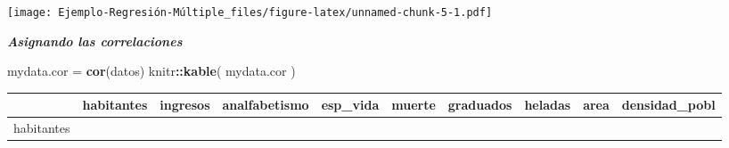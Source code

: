 \documentclass[]{article}
\newenvironment{Shaded}{\begin{snugshade}}{\end{snugshade}}
\newcommand{\KeywordTok}[1]{\textcolor[rgb]{0.13,0.29,0.53}{\textbf{#1}}}
\newcommand{\StringTok}[1]{\textcolor[rgb]{0.31,0.60,0.02}{#1}}
\newcommand{\OperatorTok}[1]{\textcolor[rgb]{0.81,0.36,0.00}{\textbf{#1}}}
\newcommand{\NormalTok}[1]{#1}
\begin{document}
\texttt{[image: Ejemplo-Regresión-Múltiple\_files/figure-latex/unnamed-chunk-5-1.pdf]}

\emph{\textbf{Asignando las correlaciones}}

\begin{Shaded}
\begin{Highlighting}[]
\NormalTok{mydata.cor =}\StringTok{ }\KeywordTok{cor}\NormalTok{(datos)}
\NormalTok{knitr}\OperatorTok{::}\KeywordTok{kable}\NormalTok{(}
\NormalTok{mydata.cor}
\NormalTok{)}
\end{Highlighting}
\end{Shaded}

\begin{longtable}[]{@{}lrrrrrrrrr@{}}
\toprule
\begin{minipage}[b]{0.09\columnwidth}\raggedright\strut
\strut
\end{minipage} & \begin{minipage}[b]{0.07\columnwidth}\raggedleft\strut
habitantes\strut
\end{minipage} & \begin{minipage}[b]{0.07\columnwidth}\raggedleft\strut
ingresos\strut
\end{minipage} & \begin{minipage}[b]{0.09\columnwidth}\raggedleft\strut
analfabetismo\strut
\end{minipage} & \begin{minipage}[b]{0.07\columnwidth}\raggedleft\strut
esp\_vida\strut
\end{minipage} & \begin{minipage}[b]{0.07\columnwidth}\raggedleft\strut
muerte\strut
\end{minipage} & \begin{minipage}[b]{0.07\columnwidth}\raggedleft\strut
graduados\strut
\end{minipage} & \begin{minipage}[b]{0.07\columnwidth}\raggedleft\strut
heladas\strut
\end{minipage} & \begin{minipage}[b]{0.07\columnwidth}\raggedleft\strut
area\strut
\end{minipage} & \begin{minipage}[b]{0.09\columnwidth}\raggedleft\strut
densidad\_pobl\strut
\end{minipage}\tabularnewline
\midrule
\endhead
\begin{minipage}[t]{0.09\columnwidth}\raggedright\strut
habitantes\strut
\end{minipage} & \begin{minipage}[t]{0.07\columnwidth}\raggedleft\strut

\end{minipage}
\end{longtable}
\end{document}
